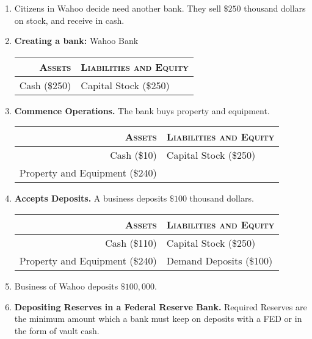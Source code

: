 \begin{enumerate}[label = \textbullet]
	\item[] Citizens in Wahoo decide need another bank. They sell $\$250$ thousand dollars on stock, and receive in cash.
	\item \textbf{Creating a bank:} Wahoo Bank
		
		\begin{table}[ht]
			\centering
			\begin{tabular}{r|l}\toprule
				\textsc{Assets}			& \textsc{Liabilities and Equity}	\\ \midrule
				Cash (\$250) & Capital Stock (\$250) \\ \bottomrule
			\end{tabular}
		\end{table}

	\item \textbf{Commence Operations.} The bank buys property and equipment.
		
		\begin{table}[ht]
			\centering
			\begin{tabular}{r|l}\toprule
				\textsc{Assets}			& \textsc{Liabilities and Equity}	\\ \midrule
				Cash (\$10) & Capital Stock (\$250)\\ 
				Property and Equipment (\$240) & \\ \bottomrule
			\end{tabular}
		\end{table}

	\item \textbf{Accepts Deposits.} A business deposits $\$100$ thousand dollars.
		
		\begin{table}[ht]
			\centering
			\begin{tabular}{r|l}\toprule
				\textsc{Assets}			& \textsc{Liabilities and Equity}	\\ \midrule
				Cash (\$110) & Capital Stock (\$250) \\ 
				Property and Equipment (\$240) & Demand Deposits (\$100) \\ \bottomrule
			\end{tabular}
		\end{table}

	\item[] Business of Wahoo deposits $\$100,000$.
	\item \textbf{Depositing Reserves in a Federal Reserve Bank.}
		Required Reserves are the minimum amount which a bank must keep on deposits with a FED or in the form of vault cash.


\end{enumerate}
